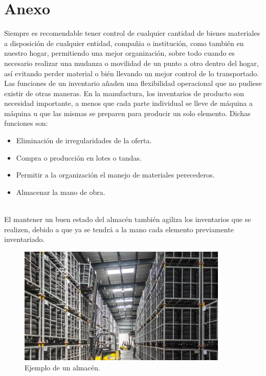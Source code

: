 \documentclass[letterpaper, 12pt]{article}
\begin{document}
    \section*{Anexo}
    \justify
    Siempre es recomendable tener control de cualquier cantidad de bienes materiales a disposición de cualquier entidad, compañia o institución, como también
    en nuestro hogar, permitiendo una mejor organización, sobre todo cuando es necesario realizar una mudanza o movilidad de un punto a otro dentro del hogar,
    así evitando perder material o bién llevando un mejor control de lo transportado.
    \\\newline
    Las funciones de un inventario añaden una flexibilidad operacional que no pudiese existir de otras maneras. En la manufactura, los inventarios de producto son
    necesidad importante, a menos que cada parte individual se lleve de máquina a máquina u que las mismas se preparen para producir un solo elemento. Dichas funciones son:
    \begin{itemize}
        \item Eliminación de irregularidades de la oferta.
        \item Compra o producción en lotes o tandas.
        \item Permitir a la organización el manejo de materiales perecederos.
        \item Almacenar la mano de obra.
    \end{itemize}
    \\\newline
    El mantener un buen estado del almacén también agiliza los inventarios que se realizen, debido a que ya se tendrá a la mano cada elemento previamente inventariado. 
    \begin{figure}[H]
        \centering
        \includegraphics[width=10cm]{almacen.jpg}
        \caption{Ejemplo de un almacén.}
    \end{figure}
    \newpage
    \thispagestyle{fancy}
    \lhead{}
    \rhead{} 
    \begin{refsection}
        \nocite{*}
        \printbibliography[title={Bibliografía}]
    \end{refsection}
        
    \newpage
    \thispagestyle{fancy}
    \lhead{}
    \rhead{} 
    \printbibliography[title={Páginas web}]
\end{document}
